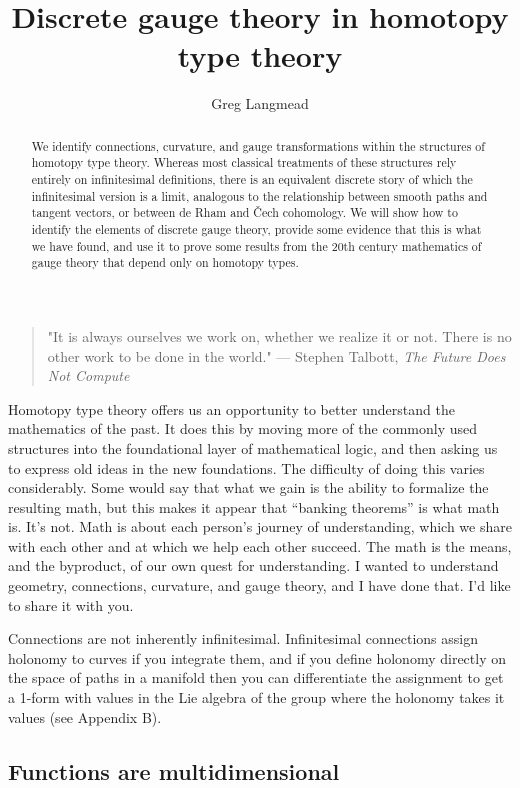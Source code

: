\documentclass[12pt]{article}
\title{Discrete gauge theory in homotopy type theory}
\author{Greg Langmead}
\begin{document}
\begin{abstract}
We identify connections, curvature, and gauge transformations within the structures of homotopy type theory. Whereas most classical treatments of these structures rely entirely on infinitesimal definitions, there is an equivalent discrete story of which the infinitesimal version is a limit, analogous to the relationship between smooth paths and tangent vectors, or between de Rham and Čech cohomology. We will show how to identify the elements of discrete gauge theory, provide some evidence that this is what we have found, and use it to prove some results from the 20th century mathematics of gauge theory that depend only on homotopy types.
\end{abstract}


\begin{quote} 
\centering 
"It is always ourselves we work on, whether we realize it or not. There is no other work to be done in the world." --- Stephen Talbott, \emph{The Future Does Not Compute}\cite{talbott}
\end{quote}

Homotopy type theory offers us an opportunity to better understand the mathematics of the past. It does this by moving more of the commonly used structures into the foundational layer of mathematical logic, and then asking us to express old ideas in the new foundations. The difficulty of doing this varies considerably. Some would say that what we gain is the ability to formalize the resulting math, but this makes it appear that ``banking theorems'' is what math is. It's not. Math is about each person's journey of understanding, which we share with each other and at which we help each other succeed. The math is the means, and the byproduct, of our own quest for understanding. I wanted to understand geometry, connections, curvature, and gauge theory, and I have done that. I'd like to share it with you.

Connections are not inherently infinitesimal. Infinitesimal connections assign holonomy to curves if you integrate them, and if you define holonomy directly on the space of paths in a manifold then you can differentiate the assignment to get a 1-form with values in the Lie algebra of the group where the holonomy takes it values (see \cite{freed1992classical} Appendix B).

\subsection{Functions are multidimensional}
\end{document}
